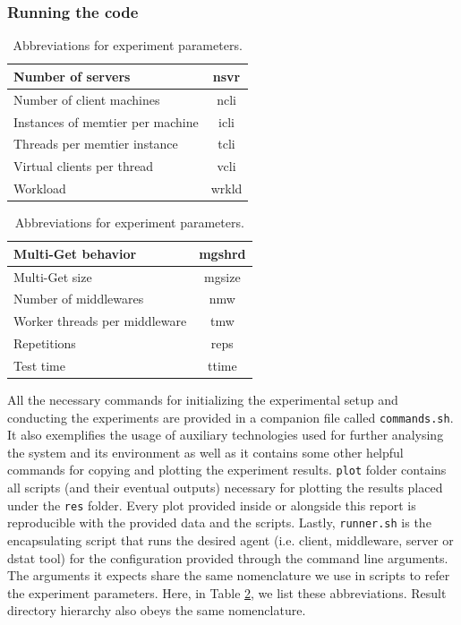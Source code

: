 \documentclass[11pt,a4paper]{article}
\begin{document}
\subsubsection*{Running the code} \label{sec:app-running-the-code}
\begin{table}[h]
\begin{minipage}{.5\textwidth}
	\centering
	\begin{tabular}{|l|c|}
		\hline Number of servers                & nsvr		\\
		\hline Number of client machines        & ncli		\\
		\hline Instances of memtier per machine & icli		\\
		\hline Threads per memtier instance     & tcli		\\
		\hline Virtual clients per thread       & vcli		\\
		\hline Workload                         & wrkld		\\
		\hline 
	\end{tabular}
\end{minipage}%
\begin{minipage}{.5\textwidth}
	\centering
	\begin{tabular}{|l|c|}
		\hline Multi-Get behavior               & mgshrd	\\
		\hline Multi-Get size                   & mgsize	\\
		\hline Number of middlewares            & nmw		\\
		\hline Worker threads per middleware    & tmw		\\
		\hline Repetitions                      & reps		\\
		\hline Test time                        & ttime		\\
		\hline 
	\end{tabular}
\end{minipage}
\caption{Abbreviations for experiment parameters.} \label{tab:param-abbrs}
\end{table}	
All the necessary commands for initializing the experimental setup and conducting the experiments are provided in a companion file called \texttt{commands.sh}. It also exemplifies the usage of auxiliary technologies used for further analysing the system and its environment as well as it contains some other helpful commands for copying and plotting the experiment results. \texttt{plot} folder contains all scripts (and their eventual outputs) necessary for plotting the results placed under the \texttt{res} folder. Every plot provided inside or alongside this report is reproducible with the provided data and the scripts. Lastly, \texttt{runner.sh} is the encapsulating script that runs the desired agent (i.e. client, middleware, server or dstat tool) for the configuration provided through the command line arguments. The arguments it expects share the same nomenclature we use	in scripts to refer the experiment parameters. Here, in Table \ref{tab:param-abbrs}, we list these abbreviations. Result directory hierarchy also obeys the same nomenclature.
\end{document}
